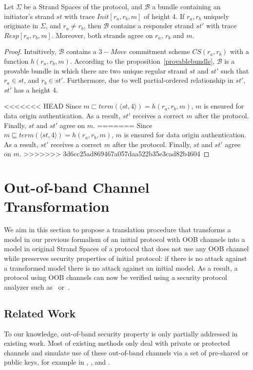 \begin{Proposition}
Let $\Sigma$ be a Strand Spaces of the protocol, and $\mathcal{B}$ a bundle containing an initiator's strand $st$ with trace $Init[r_a,r_b,m]$ of height 4. If $r_a,r_b$ uniquely originate in $\Sigma$, and $r_a \not= r_b$, then $\mathcal{B}$ contains a responder strand $st'$ with trace $Resp[r_a,r_b,m]$. Moreover, both strands agree on $r_a$, $r_b$ and $m$.
\end{Proposition}

\begin{proof}
Intuitively, $\mathcal{B}$ contains a $3-Move$ commitment scheme $CS(r_a,r_b)$ with a function $h(r_a,r_b,m)$. According to the proposition~\ref{provablebundle}, $\mathcal{B}$ is a provable bundle in which there are two unique regular strand $st$ and $st'$ such that $r_a \in st$, and $r_b \in st'$. Furthermore, due to well partial-ordered relationship in $st'$, $st'$ has a height 4. 

<<<<<<< HEAD
Since $m \sqsubset term( \langle st,4 \rangle) = h(r_a,r_b,m)$, $m$ is ensured for data origin authentication. As a result, $st'$ receives a correct $m$ after the protocol. Finally, $st$ and $st'$ agree on $m$.
=======
Since $m \sqsubseteq term( \langle st,4 \rangle) = h(r_a,r_b,m)$, $m$ is ensured for data origin authentication. As a result, $st'$ receives a correct $m$ after the protocol. Finally, $st$ and $st'$ agree on $m$.
>>>>>>> 3d6cc25ad869467a057daa522b35e3cad82b4604
\end{proof}

\section{Out-of-band Channel Transformation}

We aim in this section to propose a translation procedure that transforms a model in our previous formalism of an initial protocol with OOB channels into a model in original Strand Spaces of a protocol that does not use any OOB channel while preserves security properties of initial protocol: if there is no attack against a transformed model there is no attack against an initial model. As a result, a protocol using OOB channels can now be verified using a security protocol analyzer such as~\cite{596779} or~\cite{BlanchetCSFW01}.

\subsection{Related Work}
To our knowledge, out-of-band security property is only partially addressed in existing work. Most of existing methods only deal with private or protected channels and simulate use of these out-of-band channels via a set of pre-shared or public keys, for example in \cite{Diaz2014149}, \cite{Han:2014:SPM:2627393.2627400}, and \cite{Bella:2003aa}.

